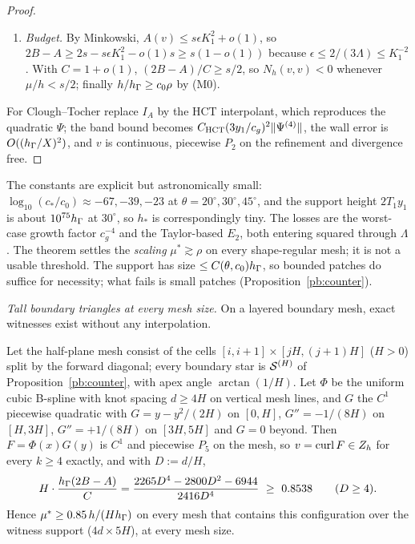 \begin{proof}
\begin{enumerate}[label=\arabic*.]
\item \emph{Budget.} By Minkowski, $A(v)\le s\epsilon K_1^2+o(1)$, so $2B-A\ge2s-s\epsilon K_1^2-o(1)s\ge s(1-o(1))$ because $\epsilon\le2/(3\Lambda)\le K_1^{-2}$. With $C=1+o(1)$, $(2B-A)/C\ge s/2$, so $N_h(v,v)<0$ whenever $\mu/h<s/2$; finally $h/h_\Gamma\ge c_0\rho$ by (M0).
\end{enumerate}
For Clough--Tocher replace $I_A$ by the HCT interpolant, which reproduces the quadratic $\Psi$; the band bound becomes $C_{\rm HCT}(3y_1/c_g)^2\lVert \Psi^{(4)}\rVert$, the wall error is $O((h_\Gamma/X)^2)$, and $v$ is continuous, piecewise $P_2$ on the refinement and divergence free.
\end{proof}

The constants are explicit but astronomically small: $\log_{10}(c_\ast/c_0)\approx-67,-39,-23$ at $\theta=20^\circ,30^\circ,45^\circ$, and the support height $2T_1y_1$ is about $10^{75}h_\Gamma$ at $30^\circ$, so $h_\ast$ is correspondingly tiny. The losses are the worst-case growth factor $c_g^{-4}$ and the Taylor-based $E_2$, both entering squared through $\Lambda$. The theorem settles the \emph{scaling} $\mu^\ast\gtrsim\rho$ on every shape-regular mesh; it is not a usable threshold. The support has size $\le C(\theta,c_0)h_\Gamma$, so bounded patches do suffice for necessity; what fails is small patches (Proposition~\ref{pb:counter}).

\emph{Tall boundary triangles at every mesh size.} On a layered boundary mesh, exact witnesses exist without any interpolation.

\begin{proposition}\label{pb:cols}
Let the half-plane mesh consist of the cells $[i,i+1]\times[jH,(j+1)H]$ ($H>0$) split by the forward diagonal; every boundary star is $\mathcal S^{(H)}$ of Proposition~\ref{pb:counter}, with apex angle $\arctan(1/H)$. Let $\Phi$ be the uniform cubic B-spline with knot spacing $d\ge4H$ on vertical mesh lines, and $G$ the $C^1$ piecewise quadratic with $G=y-y^2/(2H)$ on $[0,H]$, $G''=-1/(8H)$ on $[H,3H]$, $G''=+1/(8H)$ on $[3H,5H]$ and $G=0$ beyond. Then $F=\Phi(x)G(y)$ is $C^1$ and piecewise $P_5$ on the mesh, so $v=\operatorname{curl} F\in Z_h$ for every $k\ge4$ exactly, and with $D:=d/H$,
\[
H\cdot\frac{\hG(2B-A)}{C}=\frac{2265D^4-2800D^2-6944}{2416D^4}\ \ge\ 0.8538\qquad(D\ge4).
\]
Hence $\mu^\ast\ge0.85\,h/(Hh_\Gamma)$ on every mesh that contains this configuration over the witness support ($4d\times5H$), at every mesh size.
\end{proposition}


